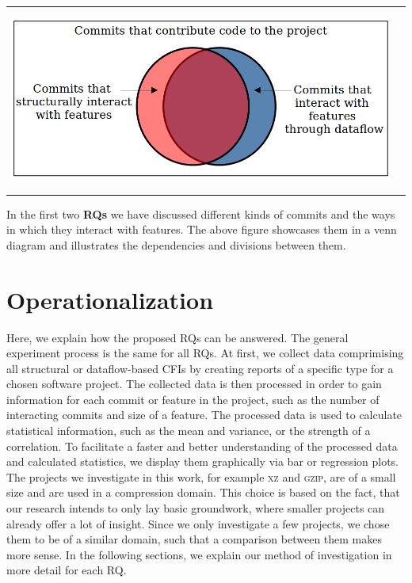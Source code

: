 \begin{center}
\begin{tabular}{cc}
\includegraphics[height=6cm]{gfx/Commits-of-a-Software-Project.png}
\end{tabular}
\end{center}
\textsf{
In the first two \textbf{RQs} we have discussed different kinds of commits and the ways in which they interact with features. 
The above figure showcases them in a venn diagram and illustrates the dependencies and divisions between them.
}

\section{Operationalization}\label{sec:operationalization}

Here, we explain how the proposed RQs can be answered.
The general experiment process is the same for all RQs.
At first, we collect data comprimising all structural or dataflow-based CFIs by creating reports of a specific type for a chosen software project.
The collected data is then processed in order to gain information for each commit or feature in the project, such as the number of interacting commits and size of a feature.
The processed data is used to calculate statistical information, such as the mean and variance, or the strength of a correlation.
To facilitate a faster and better understanding of the processed data and calculated statistics, we display them graphically via bar or regression plots.
The projects we investigate in this work, for example \textsc{xz} and \textsc{gzip}, are of a small size and are used in a compression domain.
This choice is based on the fact, that our research intends to only lay basic groundwork, where smaller projects can already offer a lot of insight.
Since we only investigate a few projects, we chose them to be of a similar domain, such that a comparison between them makes more sense.
In the following sections, we explain our method of investigation in more detail for each RQ.

